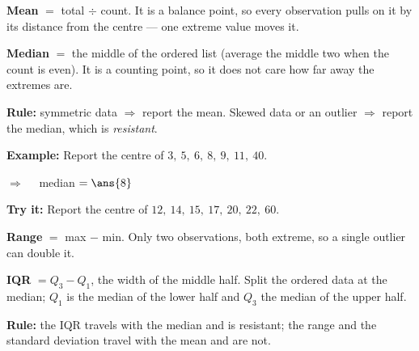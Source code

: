 \documentclass[12pt]{article}
\begin{document}


\begin{formulabox}
\textbf{Mean} $=$ total $\div$ count. It is a balance point, so every observation pulls on
it by its distance from the centre --- one extreme value moves it.\par
\smallskip
\textbf{Median} $=$ the middle of the ordered list (average the middle two when the count is
even). It is a counting point, so it does not care how far away the extremes are.\par
\smallskip
\textbf{Rule:} symmetric data $\Rightarrow$ report the mean. Skewed data or an outlier
$\Rightarrow$ report the median, which is \emph{resistant}.
\end{formulabox}

\begin{examplebox}
\textbf{Example:} \quad Report the centre of $3,\ 5,\ 6,\ 8,\ 9,\ 11,\ 40$.

$\Rightarrow\quad$ median $= \ans{8}$
\end{examplebox}

\begin{tryitbox}
\textbf{Try it:} \quad Report the centre of $12,\ 14,\ 15,\ 17,\ 20,\ 22,\ 60$.\\[2pt]
\end{tryitbox}


\begin{formulabox}
\textbf{Range} $=$ max $-$ min. Only two observations, both extreme, so a single outlier can
double it.\par
\smallskip
\textbf{IQR} $= Q_3 - Q_1$, the width of the middle half. Split the ordered data at the
median; $Q_1$ is the median of the lower half and $Q_3$ the median of the upper half.\par
\smallskip
\textbf{Rule:} the IQR travels with the median and is resistant; the range and the standard
deviation travel with the mean and are not.
\end{formulabox}
\end{document}
